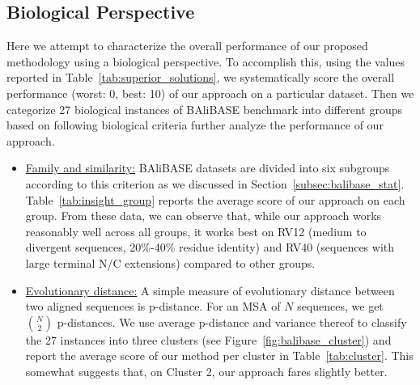 \subsection{Biological Perspective}\label{sec:cyb-biology-discussion}
Here we attempt to characterize the overall performance of our proposed methodology using a biological perspective. To accomplish this, using the values reported in Table~\ref{tab:superior_solutions}, we systematically score the overall performance (worst: 0, best: 10) of our approach on a particular dataset. Then we categorize 27 biological instances of BAliBASE benchmark into different groups based on following biological criteria further analyze the performance of our approach.
\begin{itemize}
	\item \underline{Family and similarity:} BAliBASE datasets are divided into six subgroups according to this criterion as we discussed in Section~\ref{subsec:balibase_stat}. Table~\ref{tab:insight_group} reports the average score of our approach on each group. From these data, we can observe that, while our approach works
	reasonably well across 
	all groups, it works best on RV12 (medium to divergent sequences, 20\%-40\% residue identity) and RV40 (sequences with large terminal N/C extensions) compared to other groups.
	
	\item \underline{Evolutionary distance:} A simple measure of evolutionary distance between two aligned sequences is p-distance. For an MSA of $N$ sequences, we get $N \choose 2$ p-distances. We use average p-distance and variance thereof to classify the 27 instances into three clusters (see Figure~\ref{fig:balibase_cluster}) and report the average score of our method per cluster in Table~\ref{tab:cluster}. This somewhat suggests that, on Cluster 2, our approach fares slightly better.
	
	
	
\end{itemize} 

